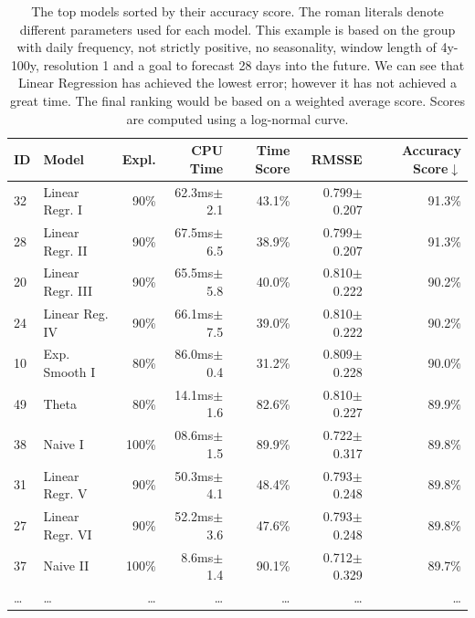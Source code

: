 \begin{table}
\fontsize{9pt}{12pt}\selectfont
\begin{tabular}{llrrrrr}
ID & Model            & Expl.   & CPU Time        & Time Score & RMSSE           & Accuracy Score$\downarrow$ \\
\hline
32 & Linear Regr. I   & 90\%    & 62.3ms$\pm$2.1 & 43.1\%     & 0.799$\pm$0.207 & 91.3\%         \\
28 & Linear Regr. II  & 90\%    & 67.5ms$\pm$6.5 & 38.9\%     & 0.799$\pm$0.207 & 91.3\%         \\
20 & Linear Regr. III & 90\%    & 65.5ms$\pm$5.8 & 40.0\%     & 0.810$\pm$0.222 & 90.2\%         \\
24 & Linear Reg. IV   & 90\%    & 66.1ms$\pm$7.5 & 39.0\%     & 0.810$\pm$0.222 & 90.2\%         \\
10 & Exp. Smooth I    & 80\%    & 86.0ms$\pm$0.4 & 31.2\%     & 0.809$\pm$0.228 & 90.0\%         \\
49 & Theta            & 80\%    & 14.1ms$\pm$1.6 & 82.6\%     & 0.810$\pm$0.227 & 89.9\%         \\
38 & Naive I          & 100\%   & 08.6ms$\pm$1.5 & 89.9\%     & 0.722$\pm$0.317 & 89.8\%         \\
31 & Linear Regr. V   & 90\%    & 50.3ms$\pm$4.1 & 48.4\%     & 0.793$\pm$0.248 & 89.8\%         \\
27 & Linear Regr. VI  & 90\%    & 52.2ms$\pm$3.6 & 47.6\%     & 0.793$\pm$0.248 & 89.8\%         \\
37 & Naive II         & 100\%   &  8.6ms$\pm$1.4 & 90.1\%     & 0.712$\pm$0.329 & 89.7\%         \\
\ldots & \ldots & \ldots & \ldots & \ldots & \ldots & \ldots
\end{tabular}
\caption{The top models sorted by their accuracy score. The roman literals denote different parameters used for each model. This example is based on the group with daily frequency, not strictly positive, no seasonality, window length of 4y-100y, resolution 1 and a goal to forecast 28 days into the future. We can see that Linear Regression has achieved the lowest error; however it has not achieved a great time. The final ranking would be based on a weighted average score. Scores are computed using a log-normal curve.}
\label{tab:groupSummary}
\end{table}
